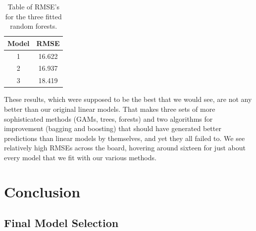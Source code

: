 \documentclass[12pt]{article}\usepackage[]{graphicx}\usepackage[]{color}
\begin{document}
\begin{table}[h]
\centering
\begin{tabular}{|c|c|}
\hline
Model & RMSE \\
\hline
1 & 16.622\\
\hline
2 & 16.937\\
\hline
3 & 18.419\\
\hline
\end{tabular}
\captionsetup{font=footnotesize,labelfont=footnotesize}
\caption{\label{tab:forestres} Table of RMSE's for the three fitted random forests.}
\end{table}

These results, which were supposed to be the best that we would see, are not any better than our original linear models. That makes three sets of more sophisticated methods (GAMs, trees, forests) and two algorithms for improvement (bagging and boosting) that should have generated better predictions than linear models by themselves, and yet they all failed to. We see relatively high RMSEs across the board, hovering around sixteen for just about every model that we fit with our various methods.\\

\section{Conclusion}

\subsection{Final Model Selection}

\newpage
\begin{flushleft}


\end{flushleft}
\end{document}
